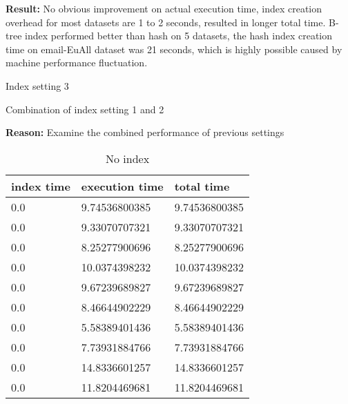 \begin{itemize*}
\par \textbf{Result:} No obvious improvement on actual execution time, index creation overhead for most datasets are 1 to 2 seconds, resulted in longer total time. B-tree index performed better than hash on 5 datasets, the hash index creation time on email-EuAll dataset was 21 seconds, which is highly possible caused by machine performance fluctuation.
\item{Index setting 3}
\par Combination of index setting 1 and 2
\par \textbf{Reason:} Examine the combined performance of previous settings

\begin{table}[H]
\begin{center}
\begin{tabular}{|l|l|l|}
\hline
index time & execution time & total time     \\ \hline
0.0 & 9.74536800385 & 9.74536800385 \\ \hline
0.0 & 9.33070707321 & 9.33070707321 \\ \hline
0.0 & 8.25277900696 & 8.25277900696 \\ \hline
0.0 & 10.0374398232 & 10.0374398232 \\ \hline
0.0 & 9.67239689827 & 9.67239689827 \\ \hline
0.0 & 8.46644902229 & 8.46644902229 \\ \hline
0.0 & 5.58389401436 & 5.58389401436 \\ \hline
0.0 & 7.73931884766 & 7.73931884766 \\ \hline
0.0 & 14.8336601257 & 14.8336601257 \\ \hline
0.0 & 11.8204469681 & 11.8204469681 \\ \hline
\end{tabular}
\end{center}
\caption{No index}
\end{table}


\end{itemize*}
